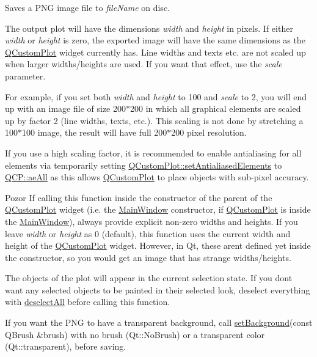Saves a P\+N\+G image file to {\itshape file\+Name} on disc. 

The output plot will have the dimensions {\itshape width} and {\itshape height} in pixels. If either {\itshape width} or {\itshape height} is zero, the exported image will have the same dimensions as the \hyperlink{classQCustomPlot}{Q\+Custom\+Plot} widget currently has. Line widths and texts etc. are not scaled up when larger widths/heights are used. If you want that effect, use the {\itshape scale} parameter.

For example, if you set both {\itshape width} and {\itshape height} to 100 and {\itshape scale} to 2, you will end up with an image file of size 200$\ast$200 in which all graphical elements are scaled up by factor 2 (line widths, texts, etc.). This scaling is not done by stretching a 100$\ast$100 image, the result will have full 200$\ast$200 pixel resolution.

If you use a high scaling factor, it is recommended to enable antialiasing for all elements via temporarily setting \hyperlink{classQCustomPlot_af6f91e5eab1be85f67c556e98c3745e8}{Q\+Custom\+Plot\+::set\+Antialiased\+Elements} to \hyperlink{namespaceQCP_ae55dbe315d41fe80f29ba88100843a0caa897c232a0ffc8368e7c100ffc59ef31}{Q\+C\+P\+::ae\+All} as this allows \hyperlink{classQCustomPlot}{Q\+Custom\+Plot} to place objects with sub-\/pixel accuracy.

\begin{DoxyWarning}{Pozor}
If calling this function inside the constructor of the parent of the \hyperlink{classQCustomPlot}{Q\+Custom\+Plot} widget (i.\+e. the \hyperlink{classMainWindow}{Main\+Window} constructor, if \hyperlink{classQCustomPlot}{Q\+Custom\+Plot} is inside the \hyperlink{classMainWindow}{Main\+Window}), always provide explicit non-\/zero widths and heights. If you leave {\itshape width} or {\itshape height} as 0 (default), this function uses the current width and height of the \hyperlink{classQCustomPlot}{Q\+Custom\+Plot} widget. However, in Qt, these aren\textquotesingle{}t defined yet inside the constructor, so you would get an image that has strange widths/heights.
\end{DoxyWarning}
The objects of the plot will appear in the current selection state. If you don\textquotesingle{}t want any selected objects to be painted in their selected look, deselect everything with \hyperlink{classQCustomPlot_a9d4808ab925b003054085246c92a257c}{deselect\+All} before calling this function.

If you want the P\+N\+G to have a transparent background, call \hyperlink{classQCustomPlot_a130358592cfca353ff3cf5571b49fb00}{set\+Background}(const Q\+Brush \&brush) with no brush (Qt\+::\+No\+Brush) or a transparent color (Qt\+::transparent), before saving.

